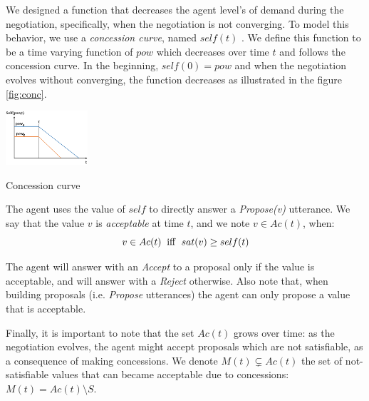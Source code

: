 \documentclass[conference, letterpaper]{IEEEtran}
\begin{document}
	We designed a function that decreases the agent level's of demand during the negotiation, specifically, when the negotiation is not converging.  To model this behavior, we use a \emph{concession curve}, named $self(t)$ . %
	We define this function to be a time varying function of $pow$ which decreases over time $t$ and follows the concession curve. In the beginning, $self(0) = pow$ and when the negotiation evolves without converging, the function decreases as illustrated in the figure \ref{fig:conc}.
	
	
	\begin{floatingfigure}[l]{1.2in}
		\captionsetup{justification=centering}
		\includegraphics[width=1.2in]{figs/s3.png}
		\caption{\label{fig:conc}Concession curve}
	\end{floatingfigure} 
	
	
	The agent uses the value of $self$ to directly answer a \emph{Propose(v)} utterance. We say that the value $v$ is \emph{acceptable} at time $t$, and we note $v \in Ac(t)$, when:
	\begin{equation}
	v\in Ac(t)\hspace{2mm}\mathrm{iff}\hspace{2mm}sat(v) \geq self(t)
	\end{equation}
	
	The agent will answer with an \emph{Accept} to a proposal only if the value is acceptable, and will answer with a \emph{Reject} otherwise. Also note that, when building proposals (i.e. \emph{Propose} utterances) the agent can only propose a value that is acceptable.
	
	Finally, it is important to note that the set $Ac(t)$ grows over time: as the negotiation evolves, the agent might accept proposals which are not satisfiable, as a consequence of making concessions. We denote $M(t)\subsetneq Ac(t)$ the set of not-satisfiable values that can became acceptable due to concessions: $M(t)=Ac(t)\setminus S$.
\end{document}
